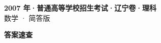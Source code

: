 \documentclass[zihao=-4, a4paper]{ctexart}
\begin{document}
\begin{center}
  {\Large\bfseries 2007 年·普通高等学校招生考试·辽宁卷·理科}\\[4pt]
  {\large 数学 · 简答版}
\end{center}
\medskip
{}

\clearpage
{}
\begin{center}{\Large\bfseries 答案速查}\end{center}
\medskip

\end{document}
